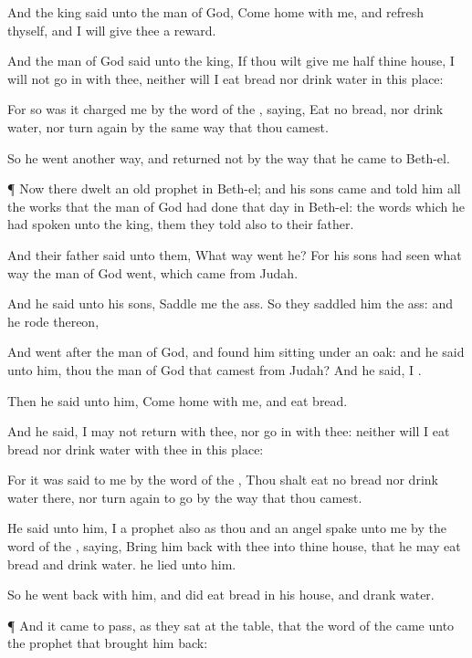 {And the
king
said unto the
man of
God,
Come
home with me, and
refresh thyself, and I will
give thee a
reward.

And the
man of
God
said unto the
king, If thou wilt
give me
half thine
house, I will not go
in with thee, neither will I
eat
bread nor
drink
water in this
place:

For so was it
charged me by the
word of the
{},
saying,
Eat no
bread, nor
drink
water, nor turn
again by the same
way that thou
camest.

So he
went
another
way, and
returned not by the
way that he
came to
Beth-el.


\par }{\PP {}¶ Now there
dwelt
an
old
prophet in
Beth-el; and his
sons
came and
told him all the
works that the
man of
God had
done that
day in
Beth-el: the
words which he had
spoken unto the
king, them they
told also to their
father.

And their
father
said unto them, What
way
went he? For his
sons had
seen
what
way the
man of
God
went, which
came from
Judah.

And he
said unto his
sons,
Saddle me the
ass. So they
saddled him the
ass: and he
rode thereon,

And
went
after the
man of
God, and
found him
sitting under an
oak: and he
said unto him,
{} thou the
man of
God that
camest from
Judah? And he
said, I
{}.

Then he
said unto him,
Come
home with me, and
eat
bread.

And he
said, I
may not
return with thee, nor go
in with thee: neither will I
eat
bread nor
drink
water with thee in this
place:

For it was
said to me by the
word of the
{}, Thou shalt
eat no
bread nor
drink
water there, nor turn
again to
go by the
way that thou
camest.

He
said unto him, I
{} a
prophet also as thou
{} and an
angel
spake unto me by the
word of the
{},
saying, Bring him
back with thee into thine
house, that he may
eat
bread and
drink
water.
{} he
lied unto him.

So he went
back with him, and did
eat
bread in his
house, and
drank
water.


\par }{\PP {}¶ And it came to pass, as they
sat at the
table, that the
word of the
{} came unto the
prophet that brought him
back:

}
